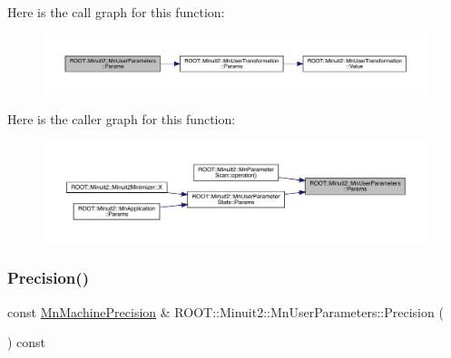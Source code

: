 Here is the call graph for this function\+:
\nopagebreak
\begin{figure}[H]
\begin{center}
\leavevmode
\includegraphics[width=350pt]{d6/d10/classROOT_1_1Minuit2_1_1MnUserParameters_a0f718b770e7fbeb503f83d8f27ca10f0_cgraph}
\end{center}
\end{figure}
Here is the caller graph for this function\+:
\nopagebreak
\begin{figure}[H]
\begin{center}
\leavevmode
\includegraphics[width=350pt]{d6/d10/classROOT_1_1Minuit2_1_1MnUserParameters_a0f718b770e7fbeb503f83d8f27ca10f0_icgraph}
\end{center}
\end{figure}
\mbox{\label{classROOT_1_1Minuit2_1_1MnUserParameters_a52f62fcd0d9d9f6e907b07cc0194f547}} 
\subsubsection{\texorpdfstring{Precision()}{Precision()}\hspace{0.1cm}{\footnotesize\ttfamily [1/3]}}
{\footnotesize\ttfamily const \mbox{\hyperlink{classROOT_1_1Minuit2_1_1MnMachinePrecision}{Mn\+Machine\+Precision}} \& R\+O\+O\+T\+::\+Minuit2\+::\+Mn\+User\+Parameters\+::\+Precision (\begin{DoxyParamCaption}{ }\end{DoxyParamCaption}) const}

